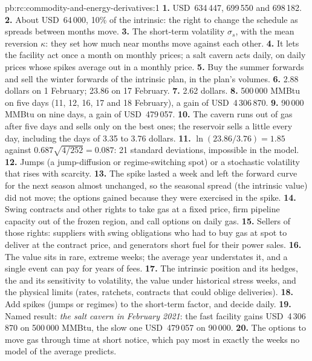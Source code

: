 \begin{solution}{pb:rc:commodity-and-energy-derivatives:1}
\textbf{1.} USD~634\,447, 699\,550 and 698\,182.
\textbf{2.} About USD~64\,000, 10\% of the intrinsic: the right to change the schedule as
spreads between months move.
\textbf{3.} The short-term volatility $\sigma_s$, with the mean reversion $\kappa$: they set how much
near months move against each other.
\textbf{4.} It lets the facility act once a month on monthly prices; a salt cavern acts daily,
on daily prices whose spikes average out in a monthly price.
\textbf{5.} Buy the summer forwards and sell the winter forwards of the intrinsic plan, in
the plan's volumes.
\textbf{6.} 2.88 dollars on 1 February; 23.86 on 17 February.
\textbf{7.} 2.62 dollars.
\textbf{8.} 500\,000 MMBtu on five days (11, 12, 16, 17 and 18 February), a gain of
USD~4\,306\,870.
\textbf{9.} 90\,000 MMBtu on nine days, a gain of USD~479\,057.
\textbf{10.} The cavern runs out of gas after five days and sells only on the best ones; the
reservoir sells a little every day, including the days of 3.35 to 3.76 dollars.
\textbf{11.} $\ln(23.86/3.76) = 1.85$ against $0.687\sqrt{4/252} = 0.087$: 21 standard deviations,
impossible in the model.
\textbf{12.} Jumps (a jump-diffusion or regime-switching spot) or a stochastic volatility
that rises with scarcity.
\textbf{13.} The spike lasted a week and left the forward curve for the next season almost
unchanged, so the seasonal spread (the intrinsic value) did not move; the options gained
because they were exercised in the spike.
\textbf{14.} Swing contracts and other rights to take gas at a fixed price, firm pipeline
capacity out of the frozen region, and call options on daily gas.
\textbf{15.} Sellers of those rights: suppliers with swing obligations who had to buy gas
at spot to deliver at the contract price, and generators short fuel for their power sales.
\textbf{16.} The value sits in rare, extreme weeks; the average year understates it, and a
single event can pay for years of fees.
\textbf{17.} The intrinsic position and its hedges, the  and its sensitivity to
volatility, the value under historical stress weeks, and the physical limits (rates,
ratchets, contracts that could oblige deliveries).
\textbf{18.} Add spikes (jumps or regimes) to the short-term factor, and decide daily.
\textbf{19.} Named result: \emph{the salt cavern in February 2021}: the fast facility gains
USD~4\,306\,870 on 500\,000 MMBtu, the slow one USD~479\,057 on 90\,000.
\textbf{20.} The options to move gas through time at short notice, which pay most in
exactly the weeks no model of the average predicts.
\end{solution}

